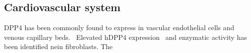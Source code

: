 \subsection{Cardiovascular system}
DPP4 has been commonly found to express in vascular endothelial cells and venous capillary beds.~\cite{Matheeussen2013,Shigeta2012} Elevated hDPP4 expression~\cite{Nemoto1999} and enzymatic activity has been identified nein fibroblasts. The  